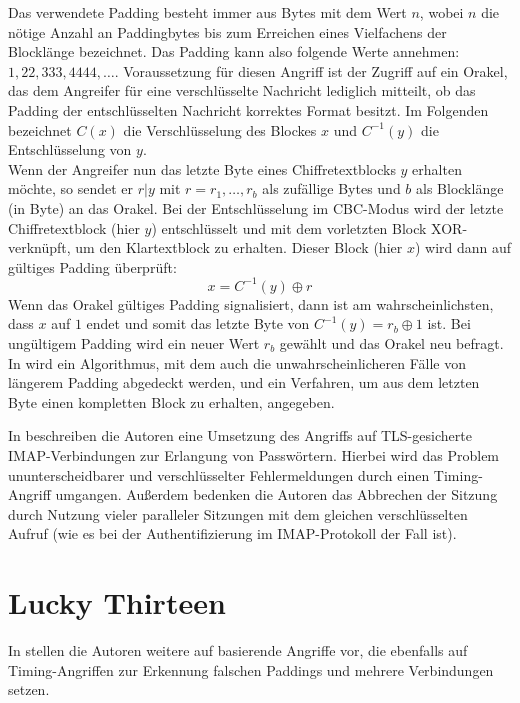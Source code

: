 Das verwendete Padding besteht immer aus Bytes mit dem Wert \(n\), wobei \(n\) die nötige Anzahl an Paddingbytes bis zum Erreichen eines Vielfachens der Blocklänge bezeichnet. Das Padding kann also folgende Werte annehmen: \(1, 22, 333, 4444, \dots\). Voraussetzung für diesen Angriff ist der Zugriff auf ein Orakel, das dem Angreifer für eine verschlüsselte Nachricht lediglich mitteilt, ob das Padding der entschlüsselten Nachricht korrektes Format besitzt. Im Folgenden bezeichnet \(C(x)\) die Verschlüsselung des Blockes \(x\) und \(C^{-1}(y)\) die Entschlüsselung von \(y\).\\
Wenn der Angreifer nun das letzte Byte eines Chiffretextblocks \(y\) erhalten möchte, so sendet er \(r | y\) mit \(r = r_1,  \dots , r_b\) als zufällige Bytes und \(b\) als Blocklänge (in Byte) an das Orakel. Bei der Entschlüsselung im CBC-Modus wird der letzte Chiffretextblock (hier \(y\)) entschlüsselt und mit dem vorletzten Block XOR-verknüpft, um den Klartextblock zu erhalten. Dieser Block (hier \(x\)) wird dann auf gültiges Padding überprüft:
\[x=C^{-1}(y) \oplus r\]
Wenn das Orakel gültiges Padding signalisiert, dann ist am wahrscheinlichsten, dass \(x\) auf \(1\) endet und somit das letzte Byte von \(C^{-1}(y)= r_b \oplus 1\) ist. Bei ungültigem Padding wird ein neuer Wert \(r_b\) gewählt und das Orakel neu befragt.\\
In \cite{vaudenay02} wird ein Algorithmus, mit dem auch die unwahrscheinlicheren Fälle von längerem Padding abgedeckt werden, und ein Verfahren, um aus dem letzten Byte einen kompletten Block zu erhalten, angegeben. 

In \cite{canvel03} beschreiben die Autoren eine Umsetzung des Angriffs auf TLS-gesicherte IMAP-Verbindungen zur Erlangung von Passwörtern. Hierbei wird das Problem ununterscheidbarer und verschlüsselter Fehlermeldungen durch einen Timing-Angriff umgangen. Außerdem bedenken die Autoren das Abbrechen der Sitzung durch Nutzung vieler paralleler Sitzungen mit dem gleichen verschlüsselten Aufruf (wie es bei der Authentifizierung im IMAP-Protokoll der Fall ist).


\section{Lucky Thirteen}

In \cite{paterson13} stellen die Autoren weitere auf \cite{vaudenay02} basierende Angriffe vor, die ebenfalls auf Timing-Angriffen zur Erkennung falschen Paddings und mehrere Verbindungen setzen.

